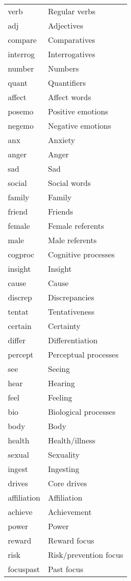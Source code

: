 \documentclass[../thesis.tex]{subfiles}
\begin{document}
\begin{longtable}[t]{ll}
verb & Regular verbs\\
adj & Adjectives\\
\addlinespace
compare & Comparatives\\
interrog & Interrogatives\\
number & Numbers\\
quant & Quantifiers\\
affect & Affect words\\
\addlinespace
posemo & Positive emotions\\
negemo & Negative emotions\\
anx & Anxiety\\
anger & Anger\\
sad & Sad\\
\addlinespace
social & Social words\\
family & Family\\
friend & Friends\\
female & Female referents\\
male & Male referents\\
\addlinespace
cogproc & Cognitive processes\\
insight & Insight\\
cause & Cause\\
discrep & Discrepancies\\
tentat & Tentativeness\\
\addlinespace
certain & Certainty\\
differ & Differentiation\\
percept & Perceptual processes\\
see & Seeing\\
hear & Hearing\\
\addlinespace
feel & Feeling\\
bio & Biological processes\\
body & Body\\
health & Health/illness\\
sexual & Sexuality\\
\addlinespace
ingest & Ingesting\\
drives & Core drives\\
affiliation & Affiliation\\
achieve & Achievement\\
power & Power\\
\addlinespace
reward & Reward focus\\
risk & Risk/prevention focus\\
focuspast & Past focus\\

\end{longtable}
\end{document}
